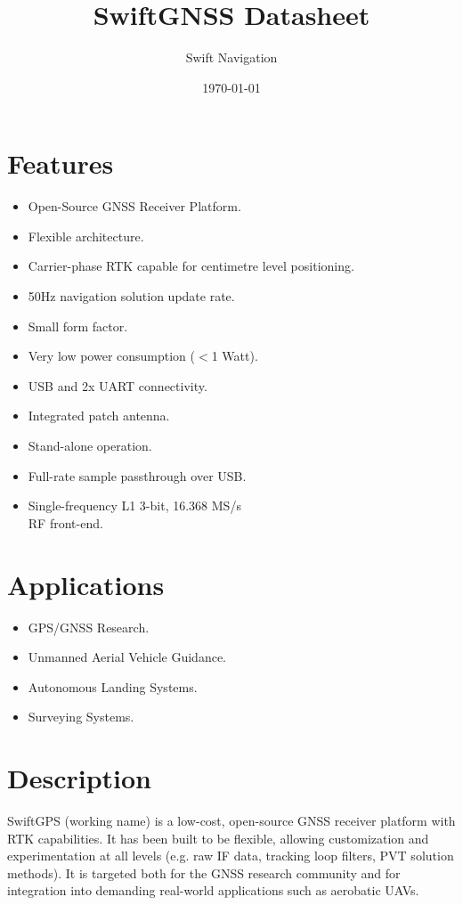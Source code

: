 \documentclass{article}
\title{SwiftGNSS Datasheet}
\author{Swift Navigation}
\date{\today}
\begin{document}
\maketitle

\begin{multicols*}{2}
\raggedcolumns

\section*{Features}
\large
\label{sec:Features}
\begin{itemize}
  \bulletnoindent
  \item Open-Source GNSS Receiver Platform.
  \item Flexible architecture.
  \item Carrier-phase RTK capable for centimetre level positioning.
  \item 50Hz navigation solution update rate.
  \item Small form factor.
  \item Very low power consumption ($<$1 Watt).
  \item USB and 2x UART connectivity.
  \item Integrated patch antenna.
  \item Stand-alone operation.
  \item Full-rate sample passthrough over USB.
  \item Single-frequency L1 3-bit, 16.368 MS/s\\RF front-end.
\end{itemize}
\normalsize

\section*{Applications}
\large
\label{sec:Applications}
\begin{itemize}
  \bulletnoindent
  \item GPS/GNSS Research.
  \item Unmanned Aerial Vehicle Guidance.
  \item Autonomous Landing Systems.
  \item Surveying Systems.
\end{itemize}
\normalsize

\section*{Description}

SwiftGPS (working name) is a low-cost, open-source GNSS receiver
platform with RTK capabilities.  It has been built to be flexible,
allowing customization and experimentation at all levels (e.g. raw IF
data, tracking loop filters, PVT solution methods).  It is targeted both for
the GNSS research community and for integration into demanding real-world
applications such as aerobatic UAVs.


\end{multicols*}
\end{document}
